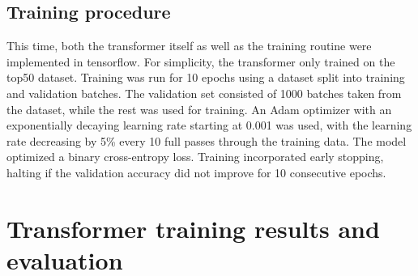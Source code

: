 \documentclass{pracalicmgr}
\begin{document}
\subsection{Training procedure}

This time, both the transformer itself as well as the training routine were implemented in tensorflow. For simplicity, the transformer only trained on the top50 dataset. Training was run for 10 epochs using a dataset split into training and validation batches. The validation set consisted of 1000 batches taken from the dataset, while the rest was used for training. An Adam optimizer with an exponentially decaying learning rate starting at 0.001 was used, with the learning rate decreasing by 5\% every 10 full passes through the training data. The model optimized a binary cross-entropy loss. Training incorporated early stopping, halting if the validation accuracy did not improve for 10 consecutive epochs.

\section{Transformer training results and evaluation}
\end{document}
